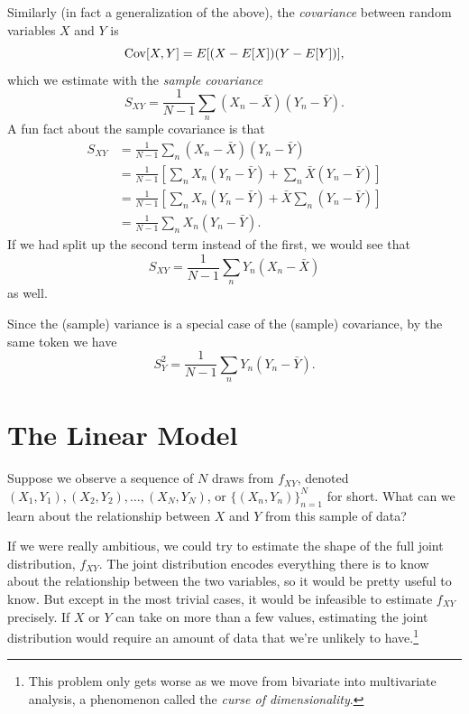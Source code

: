 \documentclass[
  12pt,
  oneside,openany]{book}
\begin{document}
Similarly (in fact a generalization of the above), the \emph{covariance} between random variables \(X\) and \(Y\) is
\[
\mathop{\rm Cov}\nolimits[X, Y] = E[(X - E[X]) (Y - E[Y])],
\]
which we estimate with the \emph{sample covariance}
\begin{equation}
S_{XY} = \frac{1}{N-1} \sum_n (X_n - \bar{X}) (Y_n - \bar{Y}).
\end{equation}
A fun fact about the sample covariance is that
\begin{align}
S_{XY}
&= \frac{1}{N-1} \sum_n (X_n - \bar{X}) (Y_n - \bar{Y}) \\
&= \frac{1}{N-1} \left[ \sum_n X_n (Y_n - \bar{Y}) + \sum_n \bar{X} (Y_n - \bar{Y}) \right] \\
&= \frac{1}{N-1} \left[ \sum_n X_n (Y_n - \bar{Y}) + \bar{X} \sum_n (Y_n - \bar{Y}) \right] \\
&= \frac{1}{N-1} \sum_n X_n (Y_n - \bar{Y}).
\end{align}
If we had split up the second term instead of the first, we would see that
\[
S_{XY} = \frac{1}{N-1} \sum_n Y_n (X_n - \bar{X})
\]
as well.

Since the (sample) variance is a special case of the (sample) covariance, by the same token we have
\begin{equation}
S_Y^2 = \frac{1}{N-1} \sum_n Y_n (Y_n - \bar{Y}).
\end{equation}

\hypertarget{the-linear-model}{%
\section{The Linear Model}\label{the-linear-model}}

Suppose we observe a sequence of \(N\) draws from \(f_{XY}\), denoted \((X_1, Y_1), (X_2, Y_2), \ldots, (X_N, Y_N)\), or \(\{(X_n, Y_n)\}_{n=1}^N\) for short. What can we learn about the relationship between \(X\) and \(Y\) from this sample of data?

If we were really ambitious, we could try to estimate the shape of the full joint distribution, \(f_{XY}\). The joint distribution encodes everything there is to know about the relationship between the two variables, so it would be pretty useful to know. But except in the most trivial cases, it would be infeasible to estimate \(f_{XY}\) precisely. If \(X\) or \(Y\) can take on more than a few values, estimating the joint distribution would require an amount of data that we're unlikely to have.\footnote{This problem only gets worse as we move from bivariate into multivariate analysis, a phenomenon called the \emph{curse of dimensionality}.}
\end{document}
